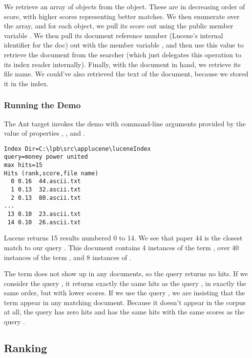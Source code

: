 We retrieve an array of  objects from the
 object.  These are in decreasing order of score, with
higher scores representing better matches.  We then enumerate over the
array, and for each  object, we pull its score out
using the public member variable .  We then pull its
document reference number (Lucene's internal identifier for the doc)
out with the member variable , and then use this value to
retrieve the document from the searcher (which just delegates this
operation to its index reader internally).  Finally, with the document
in hand, we retrieve its file name.  We could've also retrieved the
text of the document, because we stored it in the index.  

\subsubsection{Running the Demo}

The Ant target  invokes the demo with command-line
arguments provided by the value of properties ,
, and .
%
\begin{verbatim}
Index Dir=C:\lpb\src\applucene\luceneIndex
query=money power united
max hits=15
Hits (rank,score,file name)
  0 0.16  44.ascii.txt
  1 0.13  32.ascii.txt
  2 0.13  80.ascii.txt
...
 13 0.10  23.ascii.txt
 14 0.10  26.ascii.txt
\end{verbatim}
%
Lucene returns 15 results numbered 0 to 14.  We see that paper 44 is
the closest match to our query .  This
document contains 4 instances of the term , over
40 instances of the term , and 8 instances of 
.

The term  does not show up in any documents, so
the query  returns no hits.  If we consider the query
, it returns exactly the same hits as the query
, in exactly the same order, but with lower scores.  If we
use the query , we are insisting that the term
 appear in any matching document.  Because it
doesn't appear in the corpus at all, the query  has
zero hits and  has the same hits with the same
scores as the query .


\subsection{Ranking}

